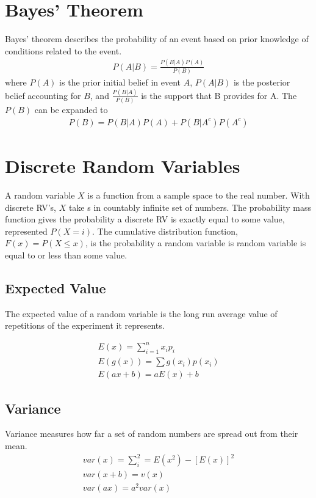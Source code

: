 \documentclass[12pt]{article}
\begin{document}
\section{Bayes' Theorem}
Bayes' theorem describes the probability of an event based on prior knowledge of conditions related to the event.
\begin{align*}
	P(A|B) = \frac{P(B|A)P(A)}{P(B)}
\end{align*}
where $P(A)$ is the prior initial belief in event $A$, $P(A|B)$ is the posterior belief accounting for $B$, and $\frac{P(B|A)}{P(B)}$ is the support that B provides for A. The $P(B)$ can be expanded to
\begin{align*}
	P(B) = P(B|A)P(A) + P(B|A^c)P(A^c)
\end{align*}

\section{Discrete Random Variables}
A random variable $X$ is a function from a sample space to the real number. With discrete RV's, $X$ take s in countably infinite set of numbers. The probability mass function gives the probability a discrete RV is exactly equal to some value, represented $P(X=i)$. The cumulative distribution function,$F(x) = P(X\le x)$, is the probability a random variable is random variable is equal to or less than some value.

\subsection{Expected Value}
The expected value of a random variable is the long run average value of repetitions of the experiment it represents.

\begin{align*}
	E(x) = \sum_{i=1}^{n} x_i p_i\\
	E(g(x)) = \sum g(x_i)p(x_i)\\
	E(ax+ b) = aE(x) + b
\end{align*} 

\subsection{Variance}
Variance measures how far a set of random numbers are spread out from their mean.
\begin{align*}
	var(x) = \sum_i^2 = E(x^2) - [E(x)]^2\\
	var(x+b) = v(x)\\
	var(ax) = a^2 var(x)
\end{align*}
\end{document}
